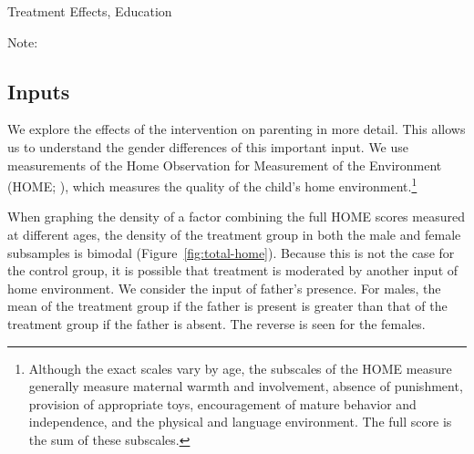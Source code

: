 \begin{table}[H]
\centering
\caption{Treatment Effects, Education}
\label{te-education}
\begin{adjustbox}{width=\textwidth}
\begin{threeparttable}
	
\begin{tablenotes}
\item Note:
\end{tablenotes}
\end{threeparttable}
\end{adjustbox}
\end{table}


\subsection{Inputs}

We explore the effects of the intervention on parenting in more detail. This allows us to understand the gender differences of this important input. We use measurements of the Home Observation for Measurement of the Environment (HOME; \citet{Bradley-Caldwell_1977_AJMD}), which measures the quality of the child's home environment.\footnote{Although the exact scales vary by age, the subscales of the HOME measure generally measure maternal warmth and involvement, absence of punishment, provision of appropriate toys, encouragement of mature behavior and independence, and the physical and language environment. The full score is the sum of these subscales.}

When graphing the density of a factor combining the full HOME scores measured at different ages, the density of the treatment group in both the male and female subsamples is bimodal (Figure~\ref{fig:total-home}). Because this is not the case for the control group, it is possible that treatment is moderated by another input of home environment. We consider the input of father's presence. For males, the mean of the treatment group if the father is present is greater than that of the treatment group if the father is absent. The reverse is seen for the females. 

